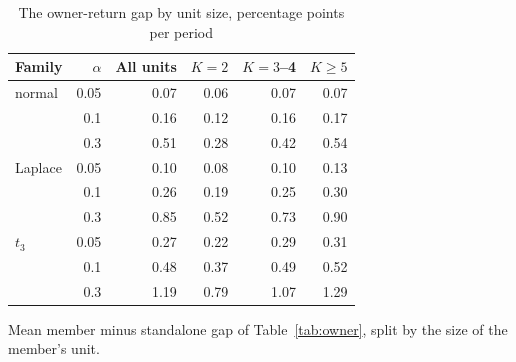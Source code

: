 \begin{table}[htbp]
\centering
\caption{The owner-return gap by unit size, percentage points per period}
\label{tab:owner-byK}
\small
\begin{tabular}{lrrrrr}
\toprule
Family & $\alpha$ & All units & $K = 2$ & $K = 3$--4 & $K \geq 5$ \\
\midrule
normal & 0.05 & 0.07 & 0.06 & 0.07 & 0.07 \\
 & 0.1 & 0.16 & 0.12 & 0.16 & 0.17 \\
 & 0.3 & 0.51 & 0.28 & 0.42 & 0.54 \\
\midrule
Laplace & 0.05 & 0.10 & 0.08 & 0.10 & 0.13 \\
 & 0.1 & 0.26 & 0.19 & 0.25 & 0.30 \\
 & 0.3 & 0.85 & 0.52 & 0.73 & 0.90 \\
\midrule
$t_3$ & 0.05 & 0.27 & 0.22 & 0.29 & 0.31 \\
 & 0.1 & 0.48 & 0.37 & 0.49 & 0.52 \\
 & 0.3 & 1.19 & 0.79 & 1.07 & 1.29 \\
\bottomrule
\end{tabular}
\par\smallskip\begin{minipage}{0.95\linewidth}\footnotesize Mean member minus standalone gap of Table~\ref{tab:owner}, split by the size of the member's unit.\end{minipage}
\end{table}
